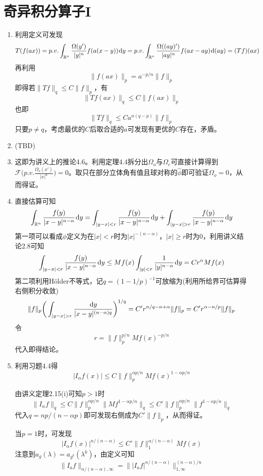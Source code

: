 \documentclass[a4paper,UTF8,fontset=windows]{ctexart}
\newcommand*{\dr}{\hspace{0.07em}\mathrm{d}}
\begin{document}
\section{奇异积分算子I}
\begin{enumerate}
    \item 利用定义可发现
    $$T(f(ax))=p.v.\int_{\mathbb{R}^n}\frac{\Omega(y')}{|y|^n}f(a(x-y))\dr y=p.v.\int_{\mathbb{R}^n}\frac{\Omega((ay)')}{|ay|^n}f(ax-ay)\dr(ay)=(Tf)(ax)$$
    再利用
    $$\|f(ax)\|_p=a^{-p/n}\|f\|_p$$
    即得若$\|Tf\|_q\le C\|f\|_p$，有
    $$\|Tf(ax)\|_q\le C\|f(ax)\|_p$$
    也即
    $$\|Tf\|_q\le Ca^{n(q-p)}\|f\|_p$$
    只要$p\ne q$，考虑最优的$C$后取合适的$a$可发现有更优的$C$存在，矛盾。

    \item (TBD)
    
    \item 这即为讲义上的推论4.6。利用定理4.4拆分出$\Omega_o$与$\Omega_e$可直接计算得到$\mathcal{F}\big(p.v.\frac{\Omega_o(x')}{|x|^n}\big)=0$。取只在部分立体角有值且球对称的$\hat{\phi}$即可验证$\Omega_o=0$，从而得证。
    
    \item 直接估算可知
    $$\int_{\mathbb{R}^n}\frac{f(y)}{|x-y|^{n-\alpha}}\dr y=\int_{|y-x|<r}\frac{f(y)}{|x-y|^{n-\alpha}}\dr y+\int_{|y-x|>r}\frac{f(y)}{|x-y|^{n-\alpha}}\dr y$$
    第一项可以看成$\phi$定义为在$|x|<r$时为$|x|^{-(n-\alpha)}$，$|x|\ge r$时为0，利用讲义结论2.8可知
    $$\int_{|y-x|<r}\frac{f(y)}{|x-y|^{n-\alpha}}\dr y\le Mf(x)\int_{|y|<r}\frac{1}{|y|^{n-\alpha}}\dr y=Cr^\alpha Mf(x)$$
    第二项利用H\"older不等式，记$q=(1-1/p)^{-1}$可放缩为(利用所给界可估算得右侧积分收敛)
    $$\|f\|_p\bigg(\int_{|y-x|>r}\frac{\dr y}{|x-y|^{(n-\alpha)q}}\bigg)^{1/q}=C'r^{n/q-n+\alpha}\|f\|_p=C'r^{\alpha-n/p}\|f\|_p$$
    令
    $$r=\|f\|_p^{p/n}Mf(x)^{-p/n}$$
    代入即得结论。

    \item 利用习题4.4得
    $$|I_\alpha f(x)|\le C\|f\|_p^{\alpha p/n}Mf(x)^{1-\alpha p/n}$$

    由讲义定理2.15(i)可知$p>1$时
    $$\|I_\alpha f\|_q\le C\|f\|_p^{\alpha p/n}\|Mf^{1-\alpha p/n}\|_q\le C'\|f\|_p^{\alpha p/n}\|f^{1-\alpha p/n}\|_q$$
    代入$q=np/(n-\alpha p)$即可发现右侧成为$C'\|f\|_p$，从而得证。

    当$p=1$时，可发现
    $$|I_\alpha f(x)|^{n/(n-\alpha)}\le C'\|f\|_1^{\alpha/(n-\alpha)}Mf(x)$$
    注意到$a_g(\lambda)=a_{g^k}(\lambda^k)$，由定义可知
    $$\|I_af\|_{n/(n-\alpha),\infty}=\||I_af|^{n/(n-\alpha)}\|_{1,\infty}^{(n-\alpha)/n}$$


\end{enumerate}
\end{document}
